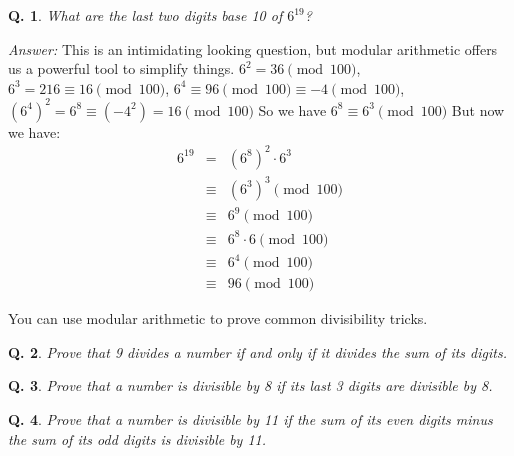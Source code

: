 \documentclass{article}
\newtheorem{question}{Q.}
\begin{document}
\begin{question}What are the last two digits base 10 of $6^{19}$?\end{question}

\emph{Answer:} This is an intimidating looking question, but modular arithmetic offers us a
powerful tool to simplify things. $6^2 = 36 \pmod{100}$, $6^3 = 216 \equiv 16 \pmod{100}$,
$6^4 \equiv 96 \pmod{100} \equiv -4 \pmod{100}$, $(6^4)^2 = 6^8 \equiv (-4^2) = 16 \pmod{100}$
So we have $6^8 \equiv 6^3 \pmod{100}$ But now we have: 
\begin{eqnarray*}
	6^{19} & =&  (6^8)^2\cdot 6^3 \\
               & \equiv & (6^3)^3 \pmod{100} \\
	       & \equiv & 6^{9} \pmod{100} \\
	       & \equiv & 6^8\cdot 6 \pmod{100} \\
	       & \equiv & 6^4 \pmod{100} \\
	       & \equiv & 96 \pmod{100} 
\end{eqnarray*}

You can use modular arithmetic to prove common divisibility tricks.

\begin{question}Prove that 9 divides a number if and only if it divides the sum of its digits.\end{question}
\vspace*{\bigskipamount}

\begin{question}Prove that a number is divisible by 8 if its last 3 digits are divisible by 8.\end{question}
\vspace*{\bigskipamount}

\begin{question}Prove that a number is divisible by 11 if the sum of its even digits minus the
sum of its odd digits is divisible by 11.\end{question}
\vspace*{\bigskipamount}
\end{document}
